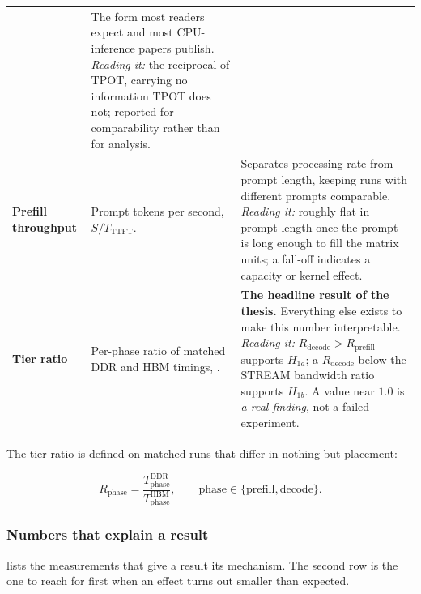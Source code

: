 {\begin{xltabular}{\textwidth}{@{}P{2.6cm}P{4.1cm}Y@{}}
& The form most readers expect and most CPU-inference papers publish.
  \emph{Reading it:} the reciprocal of TPOT, carrying no information
  TPOT does not; reported for comparability rather than for analysis. \\
\addlinespace[2pt]
\textbf{Prefill throughput}
& Prompt tokens per second, \(S/T_{\mathrm{TTFT}}\).
& Separates processing rate from prompt length, keeping runs with
  different prompts comparable.  \emph{Reading it:} roughly flat in
  prompt length once the prompt is long enough to fill the matrix
  units; a fall-off indicates a capacity or kernel effect. \\
\addlinespace[2pt]
\textbf{Tier ratio}
& Per-phase ratio of matched DDR and HBM timings, .
& \textbf{The headline result of the thesis.}  Everything else exists
  to make this number interpretable.  \emph{Reading it:}
  \(R_{\text{decode}} > R_{\text{prefill}}\) supports \(H_{1a}\); a
  \(R_{\text{decode}}\) below the STREAM bandwidth ratio supports
  \(H_{1b}\).  A value near \(1.0\) is \emph{a real finding}, not a
  failed experiment. \\
\end{xltabular}}


The tier ratio is defined on matched runs that differ in nothing but
placement:

\begin{equation}
\label{eq:ratio}
  R_{\text{phase}} =
  \frac{T_{\text{phase}}^{\text{DDR}}}{T_{\text{phase}}^{\text{HBM}}},
  \qquad \text{phase} \in \{\text{prefill}, \text{decode}\}.
\end{equation}

\subsubsection{Numbers that explain a result}

 lists the measurements that give a
result its mechanism.  The second row is the one to reach for first
when an effect turns out smaller than expected.


